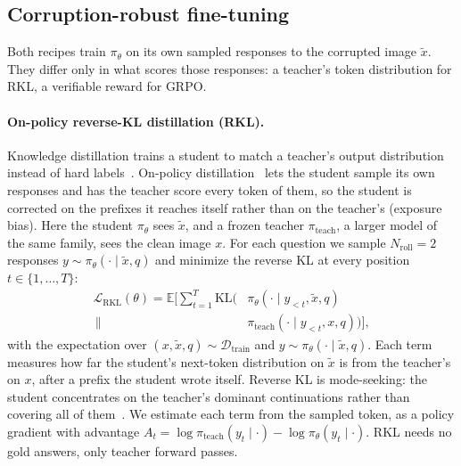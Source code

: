 \subsection{Corruption-robust fine-tuning}
\label{sec:method-ft}

Both recipes train $\pi_\theta$ on its own sampled responses to the corrupted image
$\tilde{x}$. They differ only in what scores those responses: a teacher's token
distribution for RKL, a verifiable reward for GRPO.

\paragraph{On-policy reverse-KL distillation (RKL).}
Knowledge distillation trains a student to match a teacher's output distribution instead
of hard labels~\cite{hinton2015distilling}. On-policy
distillation~\cite{agarwal2024onpolicydistillationlanguagemodels} lets the student sample
its own responses and has the teacher score every token of them, so the student is
corrected on the prefixes it reaches itself rather than on the teacher's (exposure bias).
Here the student $\pi_\theta$ sees $\tilde{x}$, and a frozen teacher
$\pi_{\mathrm{teach}}$, a larger model of the same family, sees the clean image $x$. For
each question we sample $N_{\mathrm{roll}} = 2$ responses
$y \sim \pi_\theta(\cdot \mid \tilde{x}, q)$ and minimize the reverse KL at every position
$t \in \{1,\dots,T\}$:
\begin{equation}
\begin{aligned}
\mathcal{L}_{\mathrm{RKL}}(\theta) = \mathbb{E}\Big[\textstyle\sum_{t=1}^{T}
\mathrm{KL}\big(&\pi_\theta(\cdot \mid y_{<t}, \tilde{x}, q) \\
\,\big\|\,&\pi_{\mathrm{teach}}(\cdot \mid y_{<t}, x, q)\big)\Big],
\end{aligned}
\label{eq:rkl}
\end{equation}
with the expectation over $(x, \tilde{x}, q) \sim \mathcal{D}_{\mathrm{train}}$ and
$y \sim \pi_\theta(\cdot \mid \tilde{x}, q)$. Each term measures how far the student's
next-token distribution on $\tilde{x}$ is from the teacher's on $x$, after a prefix the
student wrote itself. Reverse KL is mode-seeking: the student concentrates on the
teacher's dominant continuations rather than covering all of them~\cite{gu2024minillm}. We
estimate each term from the sampled token, as a policy gradient with advantage
$A_t = \log \pi_{\mathrm{teach}}(y_t \mid \cdot) - \log \pi_\theta(y_t \mid \cdot)$.
RKL needs
no gold answers, only teacher forward passes.

